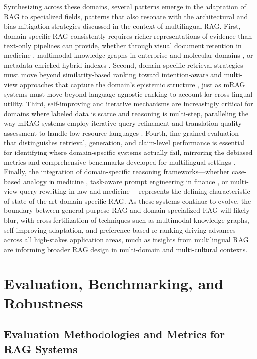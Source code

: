 \documentclass[11pt]{article}
\begin{document}
Synthesizing across these domains, several patterns emerge in the adaptation of RAG to specialized fields, patterns that also resonate with the architectural and bias-mitigation strategies discussed in the context of multilingual RAG. First, domain-specific RAG consistently requires richer representations of evidence than text-only pipelines can provide, whether through visual document retention in medicine \cite{ref389}, multimodal knowledge graphs in enterprise and molecular domains \cite{ref56}, or metadata-enriched hybrid indexes \cite{ref402}. Second, domain-specific retrieval strategies must move beyond similarity-based ranking toward intention-aware and multi-view approaches that capture the domain's epistemic structure \cite{ref396}, just as mRAG systems must move beyond language-agnostic ranking to account for cross-lingual utility. Third, self-improving and iterative mechanisms are increasingly critical for domains where labeled data is scarce and reasoning is multi-step, paralleling the way mRAG systems employ iterative query refinement and translation quality assessment to handle low-resource languages \cite{ref392}. Fourth, fine-grained evaluation that distinguishes retrieval, generation, and claim-level performance is essential for identifying where domain-specific systems actually fail, mirroring the debiased metrics and comprehensive benchmarks developed for multilingual settings \cite{ref395}. Finally, the integration of domain-specific reasoning frameworks---whether case-based analogy in medicine \cite{ref391}, task-aware prompt engineering in finance \cite{ref399}, or multi-view query rewriting in law and medicine \cite{ref396}---represents the defining characteristic of state-of-the-art domain-specific RAG. As these systems continue to evolve, the boundary between general-purpose RAG and domain-specialized RAG will likely blur, with cross-fertilization of techniques such as multimodal knowledge graphs, self-improving adaptation, and preference-based re-ranking driving advances across all high-stakes application areas, much as insights from multilingual RAG are informing broader RAG design in multi-domain and multi-cultural contexts.

\section{Evaluation, Benchmarking, and Robustness}

\subsection{Evaluation Methodologies and Metrics for RAG Systems}
\end{document}
